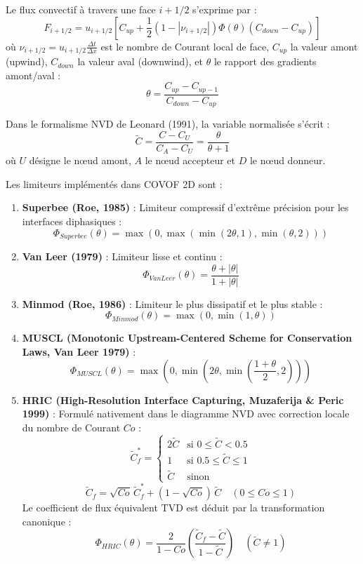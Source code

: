 \documentclass[
  french,
]{article}
\begin{document}
Le flux convectif à travers une face \(i+1/2\) s'exprime par :
\[F_{i+1/2} = u_{i+1/2} \left[ C_{up} + \frac{1}{2} (1 - |\nu_{i+1/2}|) \Phi(\theta) (C_{down} - C_{up}) \right]\]
où \(\nu_{i+1/2} = u_{i+1/2} \frac{\Delta t}{\Delta x}\) est le nombre
de Courant local de face, \(C_{up}\) la valeur amont (upwind),
\(C_{down}\) la valeur aval (downwind), et \(\theta\) le rapport des
gradients amont/aval :
\[\theta = \frac{C_{up} - C_{up-1}}{C_{down} - C_{up}}\]

Dans le formalisme NVD de Leonard (1991), la variable normalisée s'écrit
: \[\tilde{C} = \frac{C - C_U}{C_A - C_U} = \frac{\theta}{\theta + 1}\]
où \(U\) désigne le nœud amont, \(A\) le nœud accepteur et \(D\) le nœud
donneur.

Les limiteurs implémentés dans COVOF 2D sont :

\begin{enumerate}
\def\labelenumi{\arabic{enumi}.}
\item
  \textbf{Superbee (Roe, 1985)} : Limiteur compressif d'extrême
  précision pour les interfaces diphasiques :
  \[\Phi_{Superbee}(\theta) = \max \left( 0, \max(\min(2\theta, 1), \min(\theta, 2)) \right)\]
\item
  \textbf{Van Leer (1979)} : Limiteur lisse et continu :
  \[\Phi_{VanLeer}(\theta) = \frac{\theta + |\theta|}{1 + |\theta|}\]
\item
  \textbf{Minmod (Roe, 1986)} : Limiteur le plus dissipatif et le plus
  stable : \[\Phi_{Minmod}(\theta) = \max(0, \min(1, \theta))\]
\item
  \textbf{MUSCL (Monotonic Upstream-Centered Scheme for Conservation
  Laws, Van Leer 1979)} :
  \[\Phi_{MUSCL}(\theta) = \max \left( 0, \min \left( 2\theta, \min \left( \frac{1 + \theta}{2}, 2 \right) \right) \right)\]
\item
  \textbf{HRIC (High-Resolution Interface Capturing, Muzaferija \& Peric
  1999)} : Formulé nativement dans le diagramme NVD avec correction
  locale du nombre de Courant \(Co\) :
  \[\tilde{C}_f^* = \begin{cases} 2 \tilde{C} & \text{si } 0 \le \tilde{C} < 0.5 \\ 1 & \text{si } 0.5 \le \tilde{C} \le 1 \\ \tilde{C} & \text{sinon} \end{cases}\]
  \[\tilde{C}_f = \sqrt{Co} \, \tilde{C}_f^* + (1 - \sqrt{Co}) \, \tilde{C} \quad (0 \le Co \le 1)\]
  Le coefficient de flux équivalent TVD est déduit par la transformation
  canonique :
  \[\Phi_{HRIC}(\theta) = \frac{2}{1 - Co} \left( \frac{\tilde{C}_f - \tilde{C}}{1 - \tilde{C}} \right) \quad (\tilde{C} \neq 1)\]
\end{enumerate}
\end{document}
